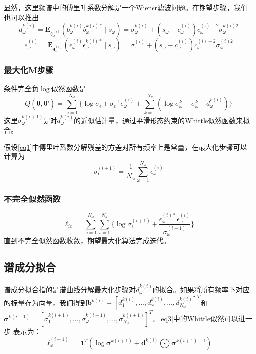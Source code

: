 显然，这里频谱中的傅里叶系数分解是一个Wiener滤波问题。在期望步骤，我们也可以推出
\begin{equation}\label{eq6}
d_\omega^{k(i)}=\mathbf{E}_{\mathbf{\theta}_\omega^{(i)}}(b_\omega^{k(i)}b_\omega^{k(i)*}\mid{s}_\omega)=\sigma_\omega^{k(i)}+(s_\omega-c_\omega^{(i)})c_\omega^{(i)-2}\sigma_\omega^{k(i)2}
\end{equation}
\begin{equation}\label{eq7}
e_\omega^{(i)}=\mathbf{E}_{\mathbf{\theta}_\omega^{(i)}}(\epsilon_\omega^{(i)}\epsilon_\omega^{k(i)*}\mid{s}_\omega)=\sigma_\epsilon^{(i)}+(s_\omega-c_\omega^{(i)})c_\omega^{(i)-2}\sigma_\omega^{(i)2}
\end{equation}

\subsubsection{最大化M步骤}
条件完全负$\log$似然函数是
\begin{equation}\label{eq8}
Q(\mathbf{\theta},\mathbf{\theta}^{i})=\sum_{\omega=1}^{N_\omega}\lbrace\log{\sigma_\epsilon}+\sigma_\epsilon^{-1}e_\omega^{(i)}+\sum_{k=1}^{N_k}(\log{\sigma}_\omega^k+\sigma_\omega^{k-1}d_\omega^{k(i)})\rbrace
\end{equation}
这里$\sigma_\omega^{k(i+1)}$是对$d_\omega^{k(i)}$的近似估计量，通过平滑形态约束的Whittle似然函数来拟合。

假设\eqref{eq1}中傅里叶系数分解残差的方差对所有频率上是常量，在最大化步骤可以计算为
\begin{equation}\label{eq9}
\sigma_\epsilon^{(i+1)}=\frac{1}{N_\omega}\sum_{\omega=1}^{N_\omega}e_\omega^{(i)}
\end{equation}

\subsubsection{不完全似然函数}
\begin{equation}\label{eq10}
\ell_{ic}=\sum_{\omega=1}^{N_\omega}\sum_{s=1}^{N_s}\lbrace\log{\sigma_\epsilon^{(i+1)}}+\frac{\epsilon_\omega^{(i)*}\epsilon_\omega^{(i)}}{\sigma_\omega^{(i+1)}}\rbrace
\end{equation}
直到不完全似然函数收敛，期望最大化算法完成迭代。

\subsection{谱成分拟合}
谱成分拟合指的是谱曲线分解最大化步骤对$d_\omega^{k(i)}$的拟合。如果将所有频率下对应的标量存为向量，我们得到$\mathbf{b}^{k(i)}=[d_1^{k(i)},...,d_\omega^{k(i)},...,d_{N_\omega}^{k(i)}]^T$和$\mathbf{\sigma}^{k(i+1)}=[\sigma_1^{k(i+1)},...,\sigma_\omega^{k(i+1)},...,\sigma_{N_\omega}^{k(i+1)}]^T$。\eqref{eq3}中的Whittle似然可以进一步
表示为：
\begin{equation}\label{eq11}
\ell_\omega^{(i+1)}=\mathbf{1}^T(\log{\mathbf{\sigma}}^{k(i+1)}+\mathbf{d}^{k(i)}\bigodot{\mathbf{\sigma}^{k(i+1)-1}})
\end{equation}

